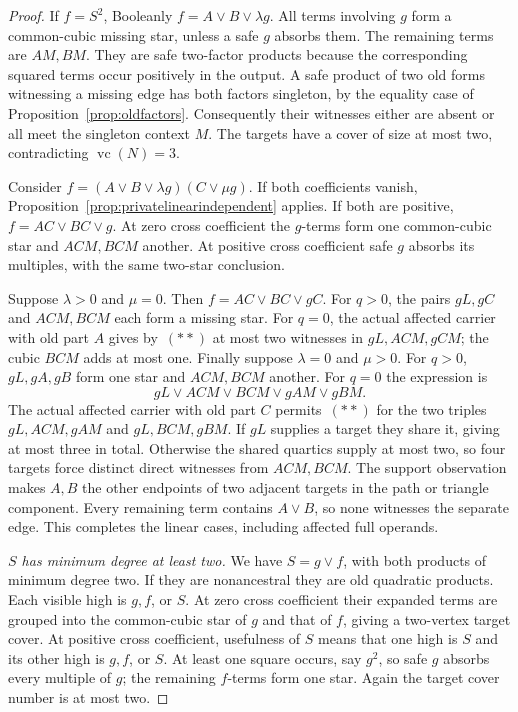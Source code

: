 \documentclass[11pt]{article}
\newcommand{\vc}{\operatorname{vc}}
\theoremstyle{definition}
\theoremstyle{remark}
\begin{document}
\begin{proof}
If $f=S^2$, Booleanly $f=A\vee B\vee\lambda g$. All terms involving $g$ form a common-cubic missing star, unless a safe $g$ absorbs them. The remaining terms are $AM,BM$. They are safe two-factor products because the corresponding squared terms occur positively in the output. A safe product of two old forms witnessing a missing edge has both factors singleton, by the equality case of Proposition~\ref{prop:oldfactors}. Consequently their witnesses either are absent or all meet the singleton context $M$. The targets have a cover of size at most two, contradicting $\vc(N)=3$.

Consider $f=(A\vee B\vee\lambda g)(C\vee\mu g)$. If both coefficients vanish, Proposition~\ref{prop:privatelinearindependent} applies. If both are positive, $f=AC\vee BC\vee g$. At zero cross coefficient the $g$-terms form one common-cubic star and $ACM,BCM$ another. At positive cross coefficient safe $g$ absorbs its multiples, with the same two-star conclusion.

Suppose $\lambda>0$ and $\mu=0$. Then $f=AC\vee BC\vee gC$. For $q>0$, the pairs $gL,gC$ and $ACM,BCM$ each form a missing star. For $q=0$, the actual affected carrier with old part $A$ gives by~$(**)$ at most two witnesses in $gL,ACM,gCM$; the cubic $BCM$ adds at most one. Finally suppose $\lambda=0$ and $\mu>0$. For $q>0$, $gL,gA,gB$ form one star and $ACM,BCM$ another. For $q=0$ the expression is
\[
 gL\vee ACM\vee BCM\vee gAM\vee gBM.
\]
The actual affected carrier with old part $C$ permits~$(**)$ for the two triples $gL,ACM,gAM$ and $gL,BCM,gBM$. If $gL$ supplies a target they share it, giving at most three in total. Otherwise the shared quartics supply at most two, so four targets force distinct direct witnesses from $ACM,BCM$. The support observation makes $A,B$ the other endpoints of two adjacent targets in the path or triangle component. Every remaining term contains $A\vee B$, so none witnesses the separate edge. This completes the linear cases, including affected full operands.

\emph{$S$ has minimum degree at least two.} We have $S=g\vee f$, with both products of minimum degree two. If they are nonancestral they are old quadratic products. Each visible high is $g,f$, or $S$. At zero cross coefficient their expanded terms are grouped into the common-cubic star of $g$ and that of $f$, giving a two-vertex target cover. At positive cross coefficient, usefulness of $S$ means that one high is $S$ and its other high is $g,f$, or $S$. At least one square occurs, say $g^2$, so safe $g$ absorbs every multiple of $g$; the remaining $f$-terms form one star. Again the target cover number is at most two.


\end{proof}
\end{document}
